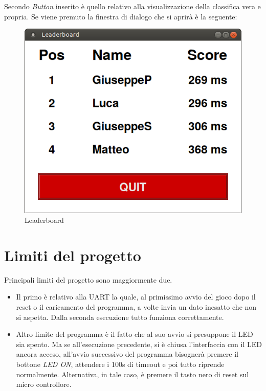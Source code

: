 \documentclass[a4paper]{article}
\begin{document}
		Secondo \textit{Button} inserito è quello relativo alla visualizzazione della classifica vera e propria. Se viene premuto la finestra di dialogo che si aprirà è la seguente:
		\begin{figure}[H]
			\centering
			\includegraphics[scale=0.35]{img/leaderboard.png}
			\caption{Leaderboard}
		\end{figure}
	\section{Limiti del progetto}
		Principali limiti del progetto sono maggiormente due.\newline
		\begin{itemize}
			\item Il primo è relativo alla UART la quale, al primissimo avvio del gioco dopo il reset o il caricamento del programma, a volte invia un dato inesatto che non si aspetta. Dalla seconda esecuzione tutto funziona correttamente.
			\item Altro limite del programma è il fatto che al suo avvio si presuppone il LED sia spento. Ma se all'esecuzione precedente, si è chiusa l'interfaccia con il LED ancora acceso,  all'avvio successivo del programma bisognerà premere il bottone \textit{LED ON}, attendere i 100s di timeout e poi tutto riprende normalmente.
			Alternativa, in tale caso, è premere il tasto nero di reset sul micro controllore.
		\end{itemize}
		
\end{document}
